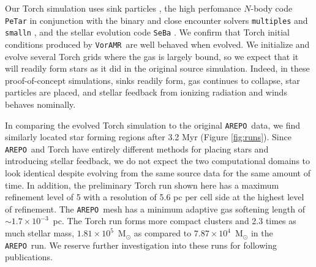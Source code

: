 \documentclass[twoside]{drexel-thesis}
\newcommand\voramr{\texttt{VorAMR}}
\newcommand\arepo{\texttt{AREPO}}
\begin{document}
\begin{thesis}
Our Torch simulation uses sink particles \citep{federrath_modeling_2010}, the high perfomance $N$-body code \texttt{PeTar} \citep{wang_petar_2020} in conjunction with the binary and close encounter solvers \texttt{multiples} \citep{portegies_zwart_astrophysical_2018} and \texttt{smalln} \citep{hut_building_1995,mcmillan_binary--single-star_1996}, and the stellar evolution code \texttt{SeBa} \citep{portegies_zwart_population_1996}. We confirm that Torch initial conditions produced by \voramr~are well behaved when evolved. We initialize and evolve several Torch grids where the gas is largely bound, so we expect that it will readily form stars as it did in the original source simulation. Indeed, in these proof-of-concept simulations, sinks readily form,  gas continues to collapse, star particles are placed, and stellar feedback from ionizing radiation and winds behaves nominally. 

In comparing the evolved Torch simulation to the original \arepo~data, we find similarly located star forming regions after 3.2 Myr (Figure \ref{fig:runs}). Since \arepo~and Torch have entirely different methods for placing stars and introducing stellar feedback, we do not expect the two computational domains to look identical despite evolving from the same source data for the same amount of time. In addition, the preliminary Torch run shown here has a maximum refinement level of 5 with a resolution of 5.6 pc per cell side at the highest level of refinement. The \arepo~mesh has a minimum adaptive gas softening length of $\sim 1.7\times10^{-3}$~pc. The Torch run forms more compact clusters and 2.3 times as much stellar mass, $1.81\times10^5$~M$_\odot$ as compared to $7.87\times10^4$~M$_\odot$ in the \arepo~run. We reserve further investigation into these runs for following publications.


\end{thesis}
\end{document}
